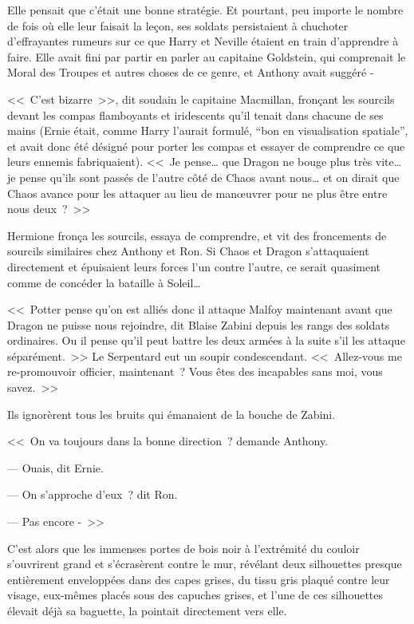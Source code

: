Elle pensait que c'était une bonne stratégie. Et pourtant, peu importe le nombre de fois où elle leur faisait la leçon, ses soldats persistaient à chuchoter d'effrayantes rumeurs sur ce que Harry et Neville étaient en train d'apprendre à faire. Elle avait fini par partir en parler au capitaine Goldstein, qui comprenait le Moral des Troupes et autres choses de ce genre, et Anthony avait suggéré -

<<~C'est bizarre~>>, dit soudain le capitaine Macmillan, fronçant les sourcils devant les compas flamboyants et iridescents qu'il tenait dans chacune de ses mains (Ernie était, comme Harry l'aurait formulé, “bon en visualisation spatiale”, et avait donc été désigné pour porter les compas et essayer de comprendre ce que leurs ennemis fabriquaient). <<~Je pense… que Dragon ne bouge plus très vite… je pense qu'ils sont passés de l'autre côté de Chaos avant nous… et on dirait que Chaos avance pour les attaquer au lieu de manœuvrer pour ne plus être entre nous deux~?~>>

Hermione fronça les sourcils, essaya de comprendre, et vit des froncements de sourcils similaires chez Anthony et Ron. Si Chaos et Dragon s'attaquaient directement et épuisaient leurs forces l'un contre l'autre, ce serait quasiment comme de concéder la bataille à Soleil…

<<~Potter pense qu'on est alliés donc il attaque Malfoy maintenant avant que Dragon ne puisse nous rejoindre, dit Blaise Zabini depuis les rangs des soldats ordinaires. Ou il pense qu'il peut battre les deux armées à la suite s'il les attaque séparément.~>> Le Serpentard eut un soupir condescendant. <<~Allez-vous me re-promouvoir officier, maintenant~? Vous êtes des incapables sans moi, vous savez.~>>

Ils ignorèrent tous les bruits qui émanaient de la bouche de Zabini.

<<~On va toujours dans la bonne direction~? demande Anthony.

--- Ouais, dit Ernie.

--- On s'approche d'eux~? dit Ron.

--- Pas encore -~>>

C'est alors que les immenses portes de bois noir à l'extrémité du couloir s'ouvrirent grand et s'écrasèrent contre le mur, révélant deux silhouettes presque entièrement enveloppées dans des capes grises, du tissu gris plaqué contre leur visage, eux-mêmes placés sous des capuches grises, et l'une de ces silhouettes élevait déjà sa baguette, la pointait directement vers elle.

